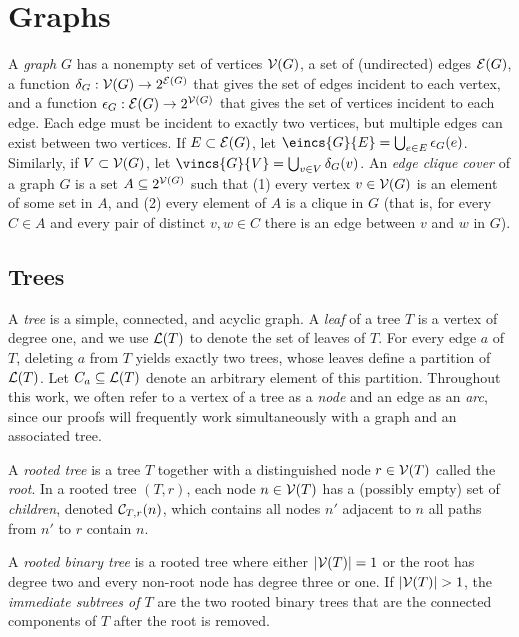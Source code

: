 \section{Graphs}
\label{sec:tensors:prelim}
A \emph{graph} $G$ has a nonempty set of vertices $\mathcal{V}(G)$, a set of (undirected) edges $\mathcal{E}(G)$, a function $\delta_G: \mathcal{V}(G) \rightarrow 2^{\mathcal{E}(G)}$ that gives the set of edges incident to each vertex, and a function $\epsilon_G: \mathcal{E}(G) \rightarrow 2^{\mathcal{V}(G)}$ that gives the set of vertices incident to each edge. Each edge must be incident to exactly two vertices, but multiple edges can exist between two vertices. If $E \subset \mathcal{E}(G)$, let $\eincs{G}{E} = \bigcup_{e \in E} \einc{G}{e}$. Similarly, if $V \subset \mathcal{V}(G)$, let $\vincs{G}{V} = \bigcup_{v \in V} \vinc{G}{v}$.
An \emph{edge clique cover} of a graph $G$ is a set $A \subseteq 2^{\mathcal{V}(G)}$ such that (1) every vertex $v \in \mathcal{V}(G)$ is an element of some set in $A$, and (2) every element of $A$ is a clique in $G$ (that is, for every $C \in A$ and every pair of distinct $v, w \in C$ there is an edge between $v$ and $w$ in $G$).

\subsection{Trees}
A \emph{tree} is a simple, connected, and acyclic graph. A \emph{leaf} of a tree $T$ is a vertex of degree one, and we use $\mathcal{L}(T)$ to denote the set of leaves of $T$. For every edge $a$ of $T$, deleting $a$ from $T$ yields exactly two trees, whose leaves define a partition of $\mathcal{L}(T)$. Let $C_a \subseteq \mathcal{L}(T)$ denote an arbitrary element of this partition. Throughout this work, we often refer to a vertex of a tree as a \emph{node} and an edge as an \emph{arc}, since our proofs will frequently work simultaneously with a graph and an associated tree.

A \emph{rooted tree} is a tree $T$ together with a distinguished node $r \in \mathcal{V}(T)$ called the \emph{root}. 
In a rooted tree $(T, r)$, each node $n \in \mathcal{V}(T)$ has a (possibly empty) set of \emph{children}, denoted $\mathcal{C}_{T,r}(n)$, which contains all nodes $n'$ adjacent to $n$ \st{} all paths from $n'$ to $r$ contain $n$.

A \emph{rooted binary tree} is a rooted tree where either $|\mathcal{V}(T)| = 1$ or the root has degree two and every non-root node has degree three or one. If $|\mathcal{V}(T)| > 1$, the \emph{immediate subtrees of $T$} are the two rooted binary trees that are the connected components of $T$ after the root is removed. 

